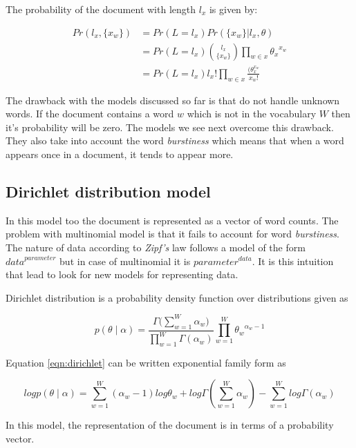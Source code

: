 The probability of the document with length \(l_x\) is given by:

\begin{align}
 Pr(l_x,\{ x_w \})	& = Pr(L=l_x)Pr(\{x_w\}|l_x,\theta) \\
			& = Pr(L=l_x) {{l_x} \choose {\{x_w\}}} \prod_{w \in x} {\theta_x}^{x_w} \\
			& = Pr(L=l_x) l_x! \prod_{w \in x} \frac{(\theta_x^{x_w}}{x_w!}
\end{align}

The drawback with the models discussed so far is that do not handle unknown words. If the document contains a word \(w\) which
is not in the vocabulary \(W\) then it's probability will be zero. The models we see next overcome this drawback. They also
take into account the word \textit{burstiness} which means that when a word appears once in a document, it tends to appear more. 

\subsection{Dirichlet distribution model}

In this model too the document is represented as a vector of word counts. The problem with multinomial model is that it fails to 
account for word \textit{burstiness}. The nature of data according to \textit{Zipf's} law follows a model of the form \({data}^{parameter}\) but in
case of multinomial it is \({parameter}^{data}\). It is this intuition that lead to look for new models for representing data.

Dirichlet distribution is a probability density function over distributions given as

\begin{equation}\label{eqn:dirichlet}
 p(\theta \mid \alpha) = \frac{\Gamma \Big( \sum_{w=1}^W \alpha_w \Big)}{\prod_{w=1}^W \Gamma (\alpha_w)} \prod_{w=1}^W {\theta_w}^{\alpha_w - 1}
\end{equation}

Equation \ref{eqn:dirichlet} can be written exponential family form as

\begin{equation}
 logp(\theta \mid \alpha) = \sum_{w=1}^W (\alpha_w - 1) log \theta_w + log \Gamma (\sum_{w=1}^W \alpha_w) - \sum_{w=1}^W log\Gamma(\alpha_w)
\end{equation}

In this model, the representation of the document is in terms of a probability vector. 


